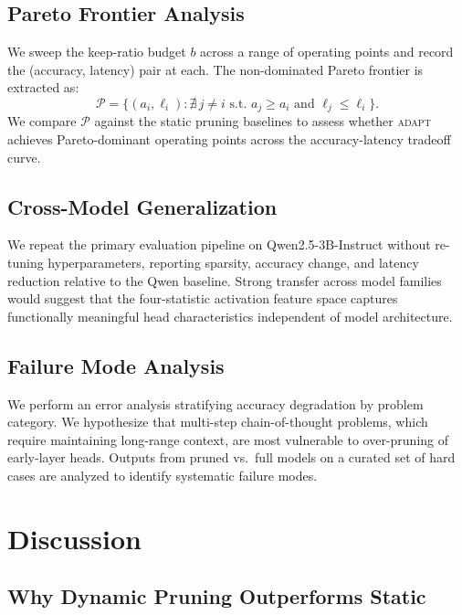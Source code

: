 \documentclass{article}
\newcommand{\system}{\textsc{adapt}}
\begin{document}
\subsection{Pareto Frontier Analysis}
\label{sec:analysis_pareto}

We sweep the keep-ratio budget $b$ across a range of operating points and record the
(accuracy, latency) pair at each. The non-dominated Pareto frontier is extracted as:
\[
  \mathcal{P} = \bigl\{(a_i, \ell_i) : \nexists\, j \neq i \text{ s.t.\ }
    a_j \geq a_i \text{ and } \ell_j \leq \ell_i\bigr\}.
\]
We compare $\mathcal{P}$ against the static pruning baselines to assess whether \system{}
achieves Pareto-dominant operating points across the accuracy-latency tradeoff curve.

\subsection{Cross-Model Generalization}
\label{sec:analysis_cross}

We repeat the primary evaluation pipeline on Qwen2.5-3B-Instruct without re-tuning
hyperparameters, reporting sparsity, accuracy change, and latency reduction relative to the
Qwen baseline. Strong transfer across model families would suggest that the four-statistic
activation feature space captures functionally meaningful head characteristics independent of
model architecture.

\subsection{Failure Mode Analysis}
\label{sec:analysis_failure}

We perform an error analysis stratifying accuracy degradation by problem category. We
hypothesize that multi-step chain-of-thought problems, which require maintaining long-range
context, are most vulnerable to over-pruning of early-layer heads. Outputs from pruned vs.\
full models on a curated set of hard cases are analyzed to identify systematic failure modes.

\section{Discussion}
\label{sec:discussion}

\subsection{Why Dynamic Pruning Outperforms Static}
\label{sec:disc_dynamic}
\end{document}
